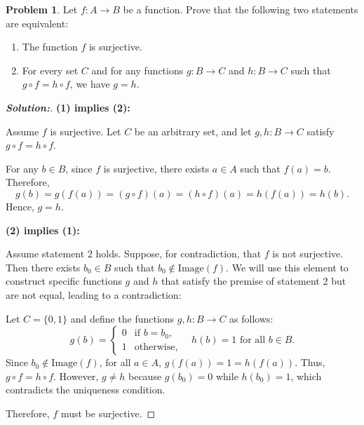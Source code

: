 \documentclass[12pt]{article}
\theoremstyle{definition}\newtheorem{problem}{Problem}
\newenvironment{solution}{\begin{proof}[\bfseries\textup{Solution:}]}{\end{proof}}
\begin{document}
\newpage
\begin{problem}
Let $f:A\to B$ be a function.  Prove that the following two statements are equivalent:
\begin{enumerate}
\item The function $f$ is surjective.
\item For every set $C$ and for any functions $g : B \to C$ and $h : B \to C$ such that $g \circ f = h \circ f$, we have $g = h$.
\end{enumerate}
\end{problem}
\begin{solution}

    \textbf{(1) implies (2):}

    Assume \( f \) is surjective. Let \( C \) be an arbitrary set, and let \( g, h: B \to C \) satisfy \( g \circ f = h \circ f \).
    
    For any \( b \in B \), since \( f \) is surjective, there exists \( a \in A \) such that \( f(a) = b \). Therefore,
    \[
    g(b) = g(f(a)) = (g \circ f)(a) = (h \circ f)(a) = h(f(a)) = h(b).
    \]
    Hence, \( g = h \).
    
    \textbf{(2) implies (1):}
    
    Assume statement 2 holds. Suppose, for contradiction, that \( f \) is not surjective. Then there exists \( b_0 \in B \) such that \( b_0 \notin \text{Image}(f) \). We will use this element to construct specific functions \( g \) and \( h \) that satisfy the premise of statement 2 but are not equal, leading to a contradiction:
    
    Let \( C = \{0, 1\} \) and define the functions \( g, h: B \to C \) as follows:
    \[
    g(b) = 
    \begin{cases}
    0 & \text{if } b = b_0, \\
    1 & \text{otherwise},
    \end{cases}
    \quad
    h(b) = 1 \text{ for all } b \in B.
    \]
    Since \( b_0 \notin \text{Image}(f) \), for all \( a \in A \), \( g(f(a)) = 1 = h(f(a)) \). Thus, \( g \circ f = h \circ f \). However, \( g \neq h \) because \( g(b_0) = 0 \) while \( h(b_0) = 1 \), which contradicts the uniqueness condition.
    
    Therefore, \( f \) must be surjective.
    


\end{solution}
\end{document}
